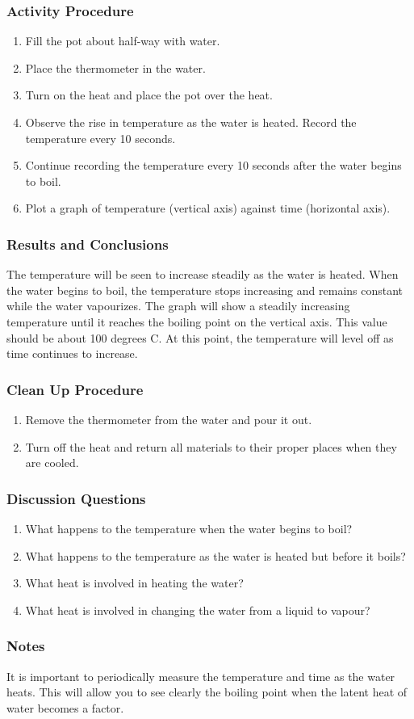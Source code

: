 \subsubsection*{Activity Procedure}
\begin{enumerate}
\item{Fill the pot about half-way with water.} 
\item{Place the thermometer in the water.} 
\item{Turn on the heat and place the pot over the heat.} 
\item{Observe the rise in temperature as the water is heated. Record the temperature every 10 seconds.} 
\item{Continue recording the temperature every 10 seconds after the water begins to boil.} 
\item{Plot a graph of temperature (vertical axis) against time (horizontal axis).} 
\end{enumerate}

\subsubsection*{Results and Conclusions}
The temperature will be seen to increase steadily as the water is heated. When the water begins to boil, the temperature stops increasing and remains constant while the water vapourizes. The graph will show a steadily increasing temperature until it reaches the boiling point on the vertical axis. This value should be about 100 degrees C. At this point, the temperature will level off as time continues to increase.  

\subsubsection*{Clean Up Procedure}
\begin{enumerate}
\item{Remove the thermometer from the water and pour it out.} 
\item{Turn off the heat and return all materials to their proper places when they are cooled.} 
\end{enumerate}

\subsubsection*{Discussion Questions}
\begin{enumerate}
\item{What happens to the temperature when the water begins to boil?}
\item{What happens to the temperature as the water is heated but before it boils?}
\item{What heat is involved in heating the water?}
\item{What heat is involved in changing the water from a liquid to vapour?}
\end{enumerate}

\subsubsection*{Notes}
It is important to periodically measure the temperature and time as the water heats.  This will allow you to see clearly the boiling point when the latent heat of water becomes a factor.


